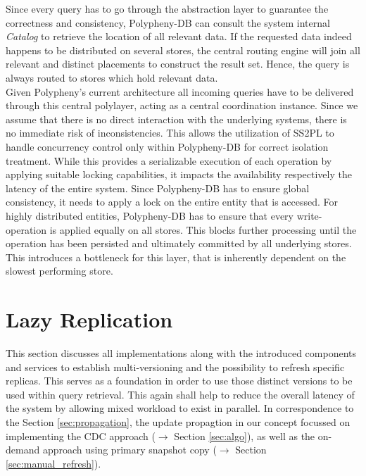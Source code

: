 Since every query has to go through the abstraction layer to guarantee the correctness 
and consistency, Polypheny-DB can consult the system internal \textit{Catalog} to retrieve the
location of all relevant data. 
If the requested data indeed happens to be distributed on several stores, the central routing engine will join all relevant and distinct 
placements to construct the result set. Hence, the query is always routed to stores which hold relevant data.\\


Given Polypheny's current architecture all incoming queries have to be delivered through this central polylayer, acting as a central coordination instance.
Since we assume that there is no direct interaction with the underlying systems, there is no immediate risk of inconsistencies. 
This allows the utilization of SS2PL to handle concurrency control only within Polypheny-DB for correct isolation treatment.
While this provides a serializable execution of each operation by applying suitable locking capabilities, it impacts the availability respectively the latency of the entire system.
Since Polypheny-DB has to ensure global consistency, it needs to apply a lock on the entire entity that is accessed. 
For highly distributed entities, Polypheny-DB has to ensure that every write-operation is applied equally on all stores.
This blocks further processing until the operation has been persisted and ultimately committed by all underlying stores.
This introduces a bottleneck for this layer, that is inherently dependent on the slowest performing store.









\section{Lazy Replication}
\label{sec:lazy_replication}

This section discusses all implementations along with the introduced components and services to establish 
multi-versioning and the possibility to refresh specific replicas. This serves as a foundation in order to use those distinct versions
to be used within query retrieval. This again shall help to reduce the overall latency of the system by allowing mixed workload to exist in parallel.
In correspondence to the Section \ref{sec:propagation}, the update propagtion in our concept focussed on implementing the CDC approach ($\rightarrow$ Section \ref{sec:algo}), 
as well as the on-demand approach using primary snapshot copy ($\rightarrow$ Section \ref{sec:manual_refresh}).


